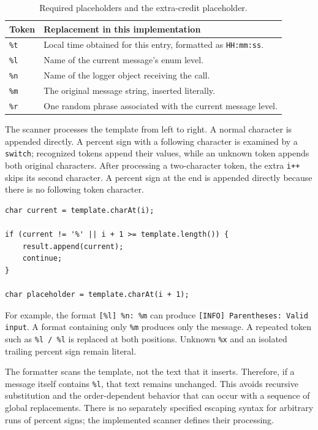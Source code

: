 \documentclass[12pt,a4paper]{article}
\newcommand{\code}[1]{\texttt{#1}}
\begin{document}
\begin{table}[H]
\centering\small
\begin{tabularx}{\textwidth}{@{}lY@{}}
\toprule
\textbf{Token} & \textbf{Replacement in this implementation}\\
\midrule
\code{\%t} & Local time obtained for this entry, formatted as \code{HH:mm:ss}.\\
\code{\%l} & Name of the current message's enum level.\\
\code{\%n} & Name of the logger object receiving the call.\\
\code{\%m} & The original message string, inserted literally.\\
\code{\%r} & One random phrase associated with the current message level.\\
\bottomrule
\end{tabularx}
\caption{Required placeholders and the extra-credit placeholder.}
\end{table}

The scanner processes the template from left to right. A normal character is appended directly. A percent sign with a following character is examined by a \code{switch}; recognized tokens append their values, while an unknown token appends both original characters. After processing a two-character token, the extra \code{i++} skips its second character. A percent sign at the end is appended directly because there is no following token character.

\begin{samepage}
\begin{lstlisting}
char current = template.charAt(i);

if (current != '%' || i + 1 >= template.length()) {
    result.append(current);
    continue;
}

char placeholder = template.charAt(i + 1);
\end{lstlisting}
\end{samepage}

For example, the format \code{[\%l] \%n: \%m} can produce \code{[INFO] Parentheses: Valid input}. A format containing only \code{\%m} produces only the message. A repeated token such as \code{\%l / \%l} is replaced at both positions. Unknown \code{\%x} and an isolated trailing percent sign remain literal.

The formatter scans the template, not the text that it inserts. Therefore, if a message itself contains \code{\%l}, that text remains unchanged. This avoids recursive substitution and the order-dependent behavior that can occur with a sequence of global replacements. There is no separately specified escaping syntax for arbitrary runs of percent signs; the implemented scanner defines their processing.
\end{document}
